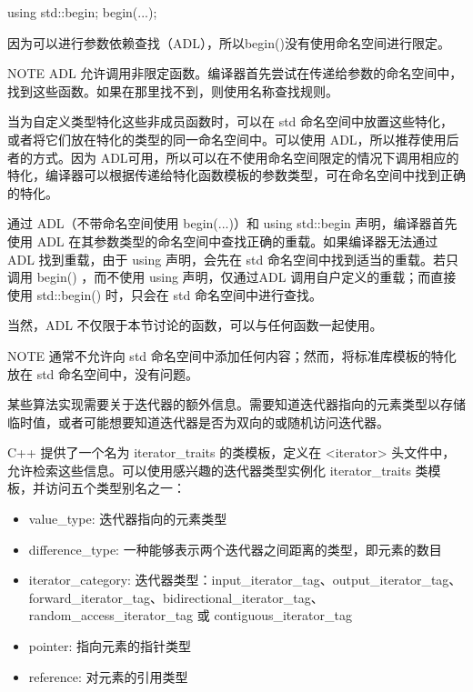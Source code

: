 \begin{cpp}
using std::begin;
begin(...);
\end{cpp}

因为可以进行参数依赖查找（ADL），所以begin()没有使用命名空间进行限定。

\begin{myNotic}{NOTE}
ADL 允许调用非限定函数。编译器首先尝试在传递给参数的命名空间中，找到这些函数。如果在那里找不到，则使用名称查找规则。
\end{myNotic}

当为自定义类型特化这些非成员函数时，可以在 std 命名空间中放置这些特化，或者将它们放在特化的类型的同一命名空间中。可以使用 ADL，所以推荐使用后者的方式。因为 ADL可用，所以可以在不使用命名空间限定的情况下调用相应的特化，编译器可以根据传递给特化函数模板的参数类型，可在命名空间中找到正确的特化。

通过 ADL（不带命名空间使用 begin(...)）和 using std::begin 声明，编译器首先使用 ADL 在其参数类型的命名空间中查找正确的重载。如果编译器无法通过 ADL 找到重载，由于 using 声明，会先在 std 命名空间中找到适当的重载。若只调用 begin() ，而不使用 using 声明，仅通过ADL 调用自户定义的重载；而直接使用 std::begin() 时，只会在 std 命名空间中进行查找。

当然，ADL 不仅限于本节讨论的函数，可以与任何函数一起使用。

\begin{myNotic}{NOTE}
通常不允许向 std 命名空间中添加任何内容；然而，将标准库模板的特化放在 std 命名空间中，没有问题。
\end{myNotic}


某些算法实现需要关于迭代器的额外信息。需要知道迭代器指向的元素类型以存储临时值，或者可能想要知道迭代器是否为双向的或随机访问迭代器。

C++ 提供了一个名为 iterator\_traits 的类模板，定义在 <iterator> 头文件中，允许检索这些信息。可以使用感兴趣的迭代器类型实例化 iterator\_traits 类模板，并访问五个类型别名之一：

\begin{itemize}
\item
value\_type: 迭代器指向的元素类型

\item
difference\_type: 一种能够表示两个迭代器之间距离的类型，即元素的数目

\item
iterator\_category: 迭代器类型：input\_iterator\_tag、output\_iterator\_tag、forward\_iterator\_tag、bidirectional\_iterator\_tag、random\_access\_iterator\_tag 或 contiguous\_iterator\_tag

\item
pointer: 指向元素的指针类型

\item
reference: 对元素的引用类型
\end{itemize}

